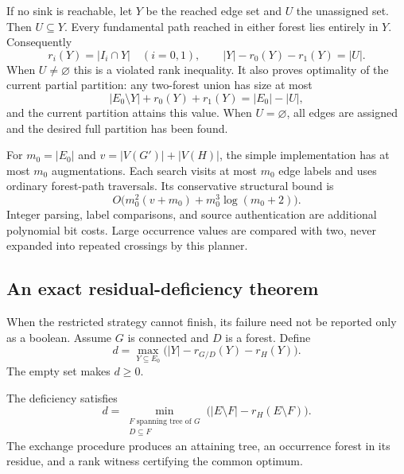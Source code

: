 If no sink is reachable, let $Y$ be the reached edge set and $U$ the
unassigned set. Then $U\subseteq Y$. Every fundamental path reached in
either forest lies entirely in $Y$. Consequently
\[
 r_i(Y)=|I_i\cap Y|\quad(i=0,1),\qquad
 |Y|-r_0(Y)-r_1(Y)=|U|.
\]
When $U\ne\varnothing$ this is a violated rank inequality. It also proves
optimality of the current partial partition: any two-forest union has size
at most
\[
 |E_0\setminus Y|+r_0(Y)+r_1(Y)=|E_0|-|U|,
\]
and the current partition attains this value. When $U=\varnothing$, all
edges are assigned and the desired full partition has been found.

For $m_0=|E_0|$ and $v=|V(G')|+|V(H)|$, the simple implementation has at
most $m_0$ augmentations. Each search visits at most $m_0$ edge labels and
uses ordinary forest-path traversals. Its conservative structural bound is
\[
 O\bigl(m_0^2(v+m_0)+m_0^3\log(m_0+2)\bigr).
\]
Integer parsing, label comparisons, and source authentication are additional
polynomial bit costs. Large occurrence values are compared with two, never
expanded into repeated crossings by this planner.

\subsection{An exact residual-deficiency theorem}

When the restricted strategy cannot finish, its failure need not be reported
only as a boolean. Assume $G$ is connected and $D$ is a forest. Define
\begin{equation}
 d=\max_{Y\subseteq E_0}
 \bigl(|Y|-r_{G/D}(Y)-r_H(Y)\bigr).
 \label{eq:deficiency}
\end{equation}
The empty set makes $d\geq0$.

\begin{theorem}
\label{thm:deficiency}
The deficiency satisfies
\begin{equation}
 d=\min_{\substack{F\text{ spanning tree of }G\\D\subseteq F}}
 \bigl(|E\setminus F|-r_H(E\setminus F)\bigr).
 \label{eq:minmax}
\end{equation}
The exchange procedure produces an attaining tree, an occurrence forest in
its residue, and a rank witness certifying the common optimum.
\end{theorem}

